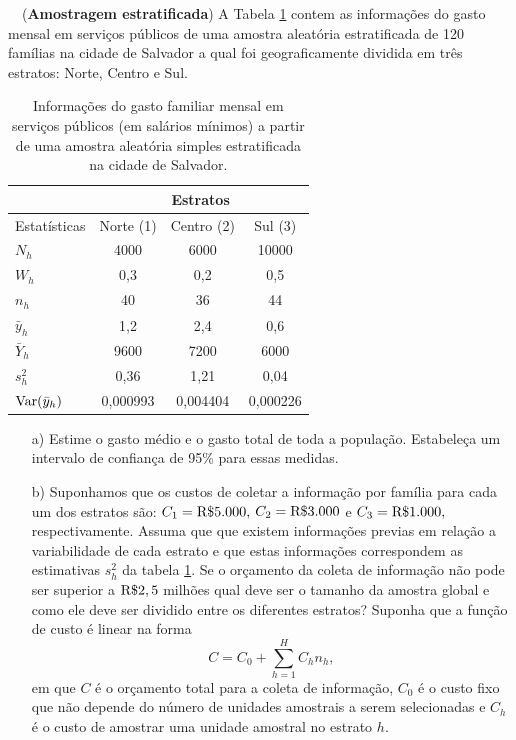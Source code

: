 \documentclass[a4paper,12pt,oneside,twocolumn]{Config/milktest}
\begin{document}
\medskip 
\question~~({\bf Amostragem estratificada}) A Tabela \ref{tab:2} contem as informações do gasto mensal em serviços públicos de uma amostra aleatória estratificada de 120 famílias na cidade de Salvador a qual foi geograficamente dividida em três estratos: Norte, Centro e Sul.

\begin{table}[!htb]
\begin{tabular}{l|ccc}
             & \multicolumn{3}{c}{Estratos}   \\ \hline
Estatísticas & Norte (1)   & Centro (2) & Sul (3)      \\ \hline
$N_h$        & 4000     & 6000     & 10000    \\
$W_h$        & 0,3      & 0,2      & 0,5      \\
$n_h$        & 40       & 36       & 44       \\
$\bar{y}_h$  & 1,2      & 2,4      & 0,6      \\
$\bar{Y}_h$  & 9600     & 7200     & 6000     \\
$s^2_h$             & 0,36     & 1,21     & 0,04     \\
${\rm Var}(\bar{y}_h)$          & 0,000993 & 0,004404 & 0,000226 \\ \hline
\end{tabular}
\caption{Informações do gasto familiar mensal em serviços públicos (em salários mínimos) a partir de uma amostra aleatória simples estratificada na cidade de Salvador.}
\label{tab:2}
\end{table}

\begin{itemize}
\item[a)]  Estime o gasto médio e o gasto total de toda a população. Estabeleça um intervalo de confiança de 95\% para essas medidas.
\item[b)] Suponhamos que os custos de coletar a informação por família para cada um dos estratos são: $C_1={\rm R}\$5.000,$ $C_2={\rm R}\$3.000$
 e $C_3={\rm R}\$1.000,$ respectivamente. Assuma que que existem informações previas em relação a variabilidade de cada estrato e que estas informações correspondem as estimativas $s^2_h$ da tabela \ref{tab:2}. Se o orçamento da coleta de informação não pode ser superior a ${\rm R}\$2,5$ milhões qual deve ser o tamanho da amostra global e como ele deve ser dividido entre os diferentes estratos? Suponha que a função de custo é linear na forma
 $$
 C = C_0+\sum_{h=1}^HC_h n_h,$$ em que $C$ 
 é o orçamento total para a coleta de informação, $C_0$ é o custo fixo que não depende do número de unidades amostrais a serem selecionadas e $C_h$ é o custo de amostrar uma unidade amostral no estrato $h.$ 
 
 \end{itemize}
\end{document}
